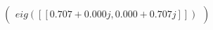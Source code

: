 \documentclass[border=1em]{standalone}
\begin{document}
$
\left(
\begin{array}{cc}
eig([[0.707+0.000j, 0.000+0.707j]])
\end{array}
\right)
$
\end{document}
